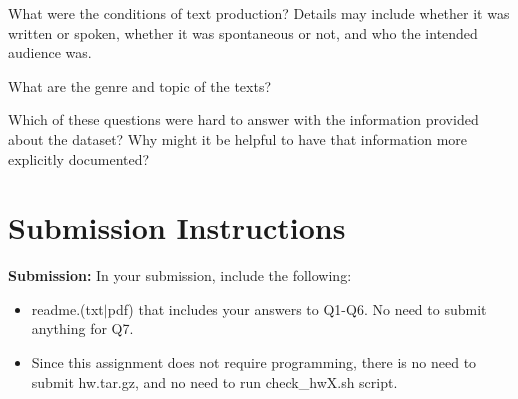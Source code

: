 \documentclass[11pt]{article}
\begin{document}
\vspace{2em}
 What were the conditions of text production?  Details may include whether it was written or spoken, whether it was spontaneous or not, and who the intended audience was.

\vspace{2em}
 What are the genre and topic of the texts?

\vspace{2em}
  Which of these questions were hard to answer with the information provided about the dataset?  Why might it be helpful to have that information more explicitly documented?

\section{Submission Instructions}

\hspace{-0.3in}
{\bf Submission:} In your submission, include the following:
\begin{itemize}
  \item readme.(txt$\mid$pdf) that includes your answers to Q1-Q6. 
    No need to submit anything for Q7.
    
  \item Since this assignment does not require programming,
      there is no need to submit hw.tar.gz,
      and no need to run check\_hwX.sh script.
   
\end{itemize}
\end{document}
